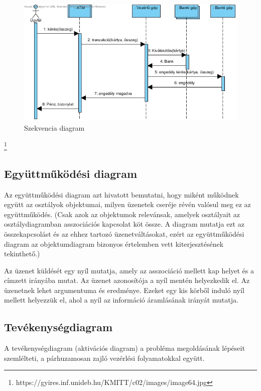 \documentclass[12pt,margin=0px]{article}
\newcommand\blfootnote[1]{%
  \begingroup
  \renewcommand\thefootnote{}\footnote{#1}%
  \addtocounter{footnote}{-1}%
  \endgroup
}
\begin{document}
\begin{itemize}
			\begin{figure}[H]
				\centering
				\includegraphics[width=1.0\textwidth]{img/szekvencia_pelda.jpg}
				\caption{Szekvencia diagram}
            \end{figure}
            \blfootnote{https://gyires.inf.unideb.hu/KMITT/c02/images/image64.jpg}					
	\end{itemize}

	\subsection*{Együttműködési diagram}

    \noindent Az együttműködési diagram azt hivatott bemutatni, hogy miként működnek együtt az osztályok objektumai, milyen üzenetek cseréje révén valósul meg ez az együttműködés.
    (Csak azok az objektumok relevánsak, amelyek osztályait az osztálydiagramban asszociációs kapcsolat köt össze. A diagram mutatja ezt az összekapcsolást és az ehhez tartozó üzenetváltásokat, ezért az együttműködési diagram az objektumdiagram bizonyos értelemben vett kiterjesztésének tekinthető.)
			
    \noindent Az üzenet küldését egy nyíl mutatja, amely az asszociáció mellett kap helyet és a címzett irányába mutat. Az üzenet azonosítója a nyíl mentén helyezkedik el. Az üzenetnek lehet argumentuma és eredménye. Ezeket egy kis körből induló nyíl mellett helyezzük el, ahol a nyíl az információ áramlásának irányát mutatja.
			
	\subsection*{Tevékenységdiagram}

	\noindent A tevékenységdiagram (aktivációs diagram) a probléma megoldásának lépéseit szemlélteti, a párhuzamosan zajló vezérlési folyamatokkal együtt.
			
\end{document}
